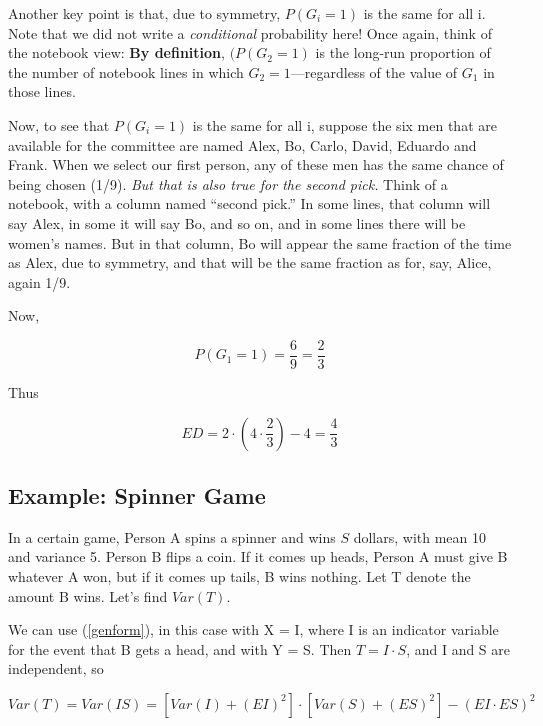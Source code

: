 Another key point is that, due to symmetry, $P(G_i = 1)$ is the same for
all i.  Note that we did not write a {\it conditional} probability
here!  Once again, think of the notebook view:  {\large \bf By
definition}, $(P(G_2 = 1)$ is the long-run proportion of the number of
notebook lines in which $G_2 = 1$---regardless of the value of $G_1$ in
those lines.

Now, to see that $P(G_i = 1)$ is the same for all i, suppose the six men
that are available for the committee are named Alex, Bo, Carlo, David,
Eduardo and Frank.  When we select our first person, any of these men
has the same chance of being chosen (1/9).  {\it But that is also true
for the second pick.}  Think of a notebook, with a column named ``second
pick.''  In some lines, that column will say Alex, in some it will say
Bo, and so on, and in some lines there will be women's names.  But in
that column, Bo will appear the same fraction of the time as Alex, due
to symmetry, and that will be the same fraction as for, say, Alice,
again 1/9.

Now,

\begin{equation}
P(G_1 = 1) = \frac{6}{9} = \frac{2}{3}
\end{equation}

Thus 

\begin{equation}
ED = 2 \cdot (4 \cdot \frac{2}{3}) -4  = \frac{4}{3}
\end{equation}

\subsection{Example:  Spinner Game}

In a certain game, Person A spins a spinner and wins $S$ dollars, with
mean 10 and variance 5.  Person B flips a coin.  If it comes up heads,
Person A must give B whatever A won, but if it comes up tails, B wins
nothing.  Let T denote the amount B wins.  Let's find $Var(T)$.

We can use (\ref{genform}), in this case with X = I, where I is an
indicator variable for the event that B gets a head, and with Y = S.
Then $T = I \cdot S$, and I and S are independent, so

\begin{equation}
Var(T) = Var(IS) = 
[Var(I) + (EI)^2] \cdot
[Var(S) + (ES)^2] - (EI \cdot ES)^2 
\end{equation}


